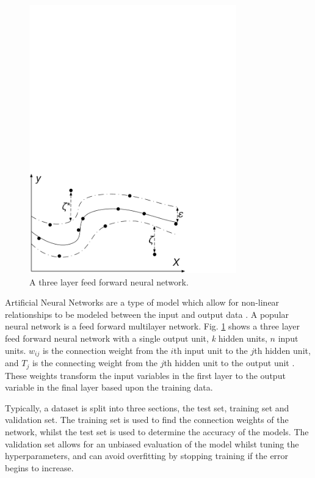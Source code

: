 \begin{figure}
	\includegraphics[width=0.8\textwidth]{Chapter5/figures/Kell_eEnergy_Fig2.pdf}
	\caption{A three layer feed forward neural network.}
	\label{fig:mlp}
\end{figure}


Artificial Neural Networks are a type of model which allow for non-linear relationships to be modeled between the input and output data \cite{Akaike1974}. A popular neural network is a feed forward multilayer network. Fig. \ref{fig:mlp} shows a three layer feed forward neural network with a single output unit, \textit{k} hidden units, $n$ input units. $w_{ij}$ is the connection weight from the $i$th input unit to the $j$th hidden unit,  and $T_j$ is the connecting weight from the $j$th hidden unit to the output unit \cite{Pao2007}. These weights transform the input variables in the first layer to the output variable in the final layer based upon the training data. 

Typically, a dataset is split into three sections, the test set, training set and validation set. The training set is used to find the connection weights of the network, whilst the test set is used to determine the accuracy of the models. The validation set allows for an unbiased evaluation of the model whilst tuning the hyperparameters, and can avoid overfitting by stopping training if the error begins to increase.


